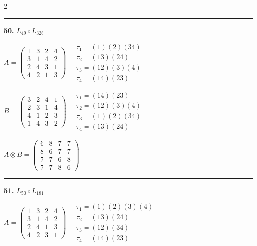 \begin{multicols}{2}
\vspace{0.3em}
\hrule
\vspace{0.3em}

\noindent\textbf{50.} $L_{49} \circ L_{326}$

$A = \begin{pmatrix} 1 & 3 & 2 & 4 \\ 3 & 1 & 4 & 2 \\ 2 & 4 & 3 & 1 \\ 4 & 2 & 1 & 3 \end{pmatrix} \quad \begin{matrix} \tau_{1}=(1)(2)(3 4) \\ \tau_{2}=(1 3)(2 4) \\ \tau_{3}=(1 2)(3)(4) \\ \tau_{4}=(1 4)(2 3) \end{matrix}$

$B = \begin{pmatrix} 3 & 2 & 4 & 1 \\ 2 & 3 & 1 & 4 \\ 4 & 1 & 2 & 3 \\ 1 & 4 & 3 & 2 \end{pmatrix} \quad \begin{matrix} \tau_{1}=(1 4)(2 3) \\ \tau_{2}=(1 2)(3)(4) \\ \tau_{3}=(1)(2)(3 4) \\ \tau_{4}=(1 3)(2 4) \end{matrix}$

$A \otimes B = \begin{pmatrix} 6 & 8 & 7 & 7 \\ 8 & 6 & 7 & 7 \\ 7 & 7 & 6 & 8 \\ 7 & 7 & 8 & 6 \end{pmatrix}$

\vspace{0.3em}
\hrule
\vspace{0.3em}

\noindent\textbf{51.} $L_{50} \circ L_{181}$

$A = \begin{pmatrix} 1 & 3 & 2 & 4 \\ 3 & 1 & 4 & 2 \\ 2 & 4 & 1 & 3 \\ 4 & 2 & 3 & 1 \end{pmatrix} \quad \begin{matrix} \tau_{1}=(1)(2)(3)(4) \\ \tau_{2}=(1 3)(2 4) \\ \tau_{3}=(1 2)(3 4) \\ \tau_{4}=(1 4)(2 3) \end{matrix}$


\end{multicols}
